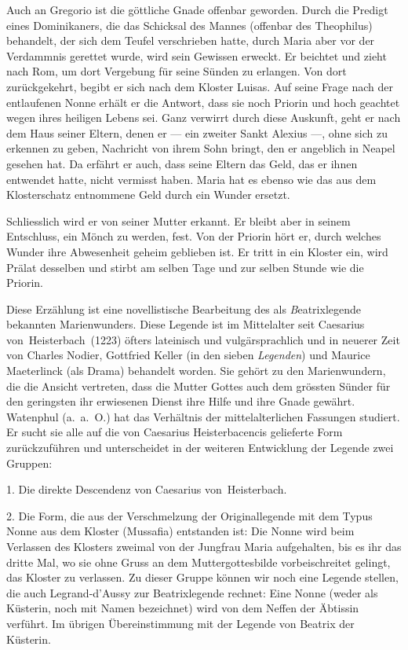 Auch an Gregorio ist die göttliche Gnade offenbar geworden.
Durch die Predigt eines Dominikaners, die das Schicksal des Mannes
(offenbar des Theophilus) behandelt, der sich dem Teufel verschrieben
hatte, durch Maria aber vor der Verdammnis gerettet wurde, wird sein
Gewissen erweckt. Er beichtet und zieht nach Rom, um dort Vergebung
für seine Sünden zu erlangen. Von dort zurückgekehrt, begibt er sich
nach dem Kloster Luisas. Auf seine Frage nach der entlaufenen Nonne
erhält er die Antwort, dass sie noch Priorin und hoch geachtet wegen
ihres heiligen Lebens sei. Ganz verwirrt durch diese Auskunft, geht
er nach dem Haus seiner Eltern, denen er --- ein zweiter Sankt Alexius ---,
ohne sich zu erkennen zu geben, Nachricht von ihrem Sohn bringt, den
er angeblich in Neapel gesehen hat. Da erfährt er auch, dass seine
Eltern das Geld, das er ihnen entwendet hatte, nicht vermisst haben.
Maria hat es ebenso wie das aus dem Klosterschatz entnommene Geld
durch ein Wunder ersetzt.

Schliesslich wird er von seiner Mutter erkannt. Er bleibt aber in
seinem Entschluss, ein Mönch zu werden, fest. Von der Priorin hört
er, durch welches Wunder ihre Abwesenheit geheim geblieben ist. Er
tritt in ein Kloster ein, wird Prälat desselben und stirbt am selben
Tage und zur selben Stunde wie die Priorin.

Diese Erzählung ist eine novellistische Bearbeitung des als
{\emph Beatrixlegende} bekannten Marienwunders.
Diese Legende ist im Mittelalter seit Caesarius von~Heisterbach~(1223)
öfters lateinisch und vulgärsprachlich
und in neuerer Zeit von Charles Nodier, Gottfried Keller
(in den sieben {\it Legenden\/}) und Maurice Maeterlinck (als Drama)
behandelt worden. Sie gehört zu den Marienwundern, die die Ansicht
vertreten, dass die Mutter Gottes auch dem grössten Sünder für den
geringsten ihr erwiesenen Dienst ihre Hilfe und ihre Gnade gewährt.
Watenphul (a.~a.~O.) hat das Verhältnis der mittelalterlichen Fassungen
studiert. Er sucht sie alle auf die von Caesarius Heisterbacencis
gelieferte Form zurückzuführen und unterscheidet in der weiteren
Entwicklung der Legende zwei Gruppen:

1. Die direkte Descendenz von Caesarius von~Heisterbach.

2. Die Form, die aus der Verschmelzung der Originallegende mit
dem Typus {\quoted Nonne aus dem Kloster} (Mussafia) entstanden ist: {\quoted Die
Nonne wird beim Verlassen des Klosters zweimal von der Jungfrau Maria
aufgehalten, bis es ihr das dritte Mal, wo sie ohne Gruss an dem Muttergottesbilde
vorbeischreitet gelingt, das Kloster zu verlassen.} Zu dieser
Gruppe können wir noch eine Legende stellen, die auch Legrand-d'Aussy
zur Beatrixlegende rechnet: {\quoted Eine Nonne (weder als Küsterin, noch mit
Namen bezeichnet) wird von dem Neffen der Äbtissin verführt. Im
übrigen Übereinstimmung mit der Legende von Beatrix der Küsterin.}


